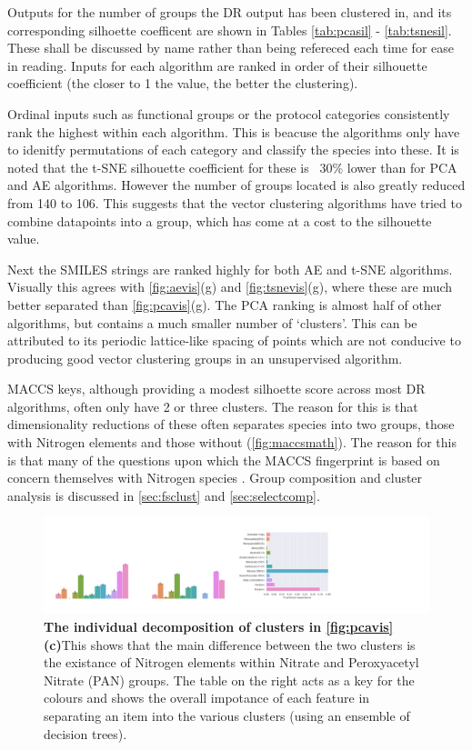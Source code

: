 Outputs for the number of groups the DR output has been clustered in, and its corresponding silhoette coefficent are shown in Tables \ref{tab:pcasil} - \ref{tab:tsnesil}. These shall be discussed by name rather than being refereced each time for ease in reading.
Inputs for each algorithm are ranked in order of their silhouette coefficient (the closer to 1 the value, the better the clustering).

Ordinal inputs such as functional groups or the protocol categories consistently rank the highest within each algorithm. This is beacuse the algorithms only have to idenitfy permutations of each category and classify the species into these. It is noted that the t-SNE silhouette coefficient for these is ~30\% lower than for PCA and AE algorithms. However the number of groups located is also greatly reduced from 140 to 106. This suggests that the vector clustering algorithms have tried to combine datapoints into a group, which has come at a cost to the silhouette value.

Next the SMILES strings are ranked highly for both AE and t-SNE algorithms. Visually this agrees with \autoref{fig:aevis}(g) and \autoref{fig:tsnevis}(g), where these are much better separated than \autoref{fig:pcavis}(g). The PCA ranking is almost half of other algorithms, but contains a much smaller number of `clusters'. This can be attributed to its periodic lattice-like spacing of points which are not conducive to producing good vector clustering groups in an unsupervised algorithm.

MACCS keys, although providing a modest silhoette score across most DR algorithms, often only have 2 or three clusters. The reason for this is that dimensionality reductions of these often separates species into two groups, those with Nitrogen elements and those without (\autoref{fig:maccsmath}). The reason for this is that many of the questions upon which the MACCS fingerprint is based on concern themselves with Nitrogen species \cite{rdkitcode}. Group composition and cluster analysis is discussed in \autoref{sec:fsclust} and \autoref{sec:selectcomp}.\\

\begin{figure}[H]
    \includegraphics[width=\textwidth]{outputs/PCA/maccs/group.png}
    \caption{\textbf{The individual decomposition of clusters in \autoref{fig:pcavis}(c)}This shows that the main difference between the two clusters is the existance of Nitrogen elements within Nitrate and Peroxyacetyl Nitrate (PAN) groups. The table on the right acts as a key for the colours and shows the overall impotance of each feature in separating an item into the various clusters (using an ensemble of decision trees).}
    \label{fig:maccsmath}
\end{figure}


